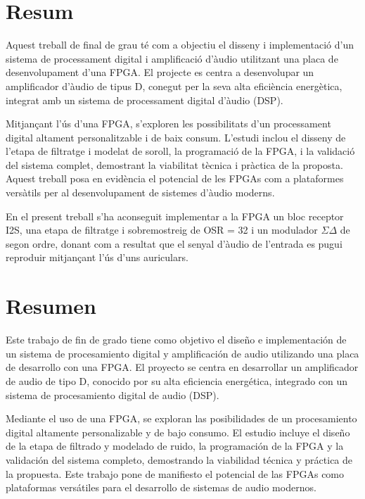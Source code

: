 
\chapter*{Resum}
\par Aquest treball de final de grau té com a objectiu el disseny i implementació d'un sistema de processament digital i amplificació d'àudio utilitzant una placa de desenvolupament d'una FPGA. El projecte es centra a desenvolupar un amplificador d'àudio de tipus D, conegut per la seva alta eficiència energètica, integrat amb un sistema de processament digital d'àudio (DSP).

\par Mitjançant l'ús d'una FPGA, s'exploren les possibilitats d'un processament digital altament personalitzable i de baix consum. L'estudi inclou el disseny de l'etapa de filtratge i modelat de soroll, la programació de la FPGA, i la validació del sistema complet, demostrant la viabilitat tècnica i pràctica de la proposta. Aquest treball posa en evidència el potencial de les FPGAs com a plataformes versàtils per al desenvolupament de sistemes d'àudio moderns.

\par En el present treball s'ha aconseguit implementar a la FPGA un bloc receptor I2S, una etapa de filtratge i sobremostreig de OSR = 32 i un modulador $\Sigma \Delta$ de segon ordre, donant com a resultat que el senyal d'àudio de l'entrada es pugui reproduir mitjançant l'ús d'uns auriculars. 


\chapter*{Resumen}
\par Este trabajo de fin de grado tiene como objetivo el diseño e implementación de un sistema de procesamiento digital y amplificación de audio utilizando una placa de desarrollo con una FPGA. El proyecto se centra en desarrollar un amplificador de audio de tipo D, conocido por su alta eficiencia energética, integrado con un sistema de procesamiento digital de audio (DSP).

\par Mediante el uso de una FPGA, se exploran las posibilidades de un procesamiento digital altamente personalizable y de bajo consumo. El estudio incluye el diseño de la etapa de filtrado y modelado de ruido, la programación de la FPGA y la validación del sistema completo, demostrando la viabilidad técnica y práctica de la propuesta. Este trabajo pone de manifiesto el potencial de las FPGAs como plataformas versátiles para el desarrollo de sistemas de audio modernos.

